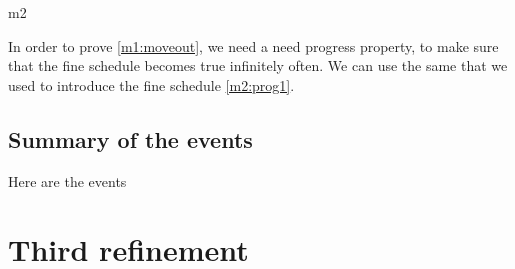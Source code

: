 \documentclass[12pt]{amsart}
\begin{document}
\begin{machine}{m2}


In order to prove \ref{m1:moveout}, we need a need progress property, to make sure that the fine schedule becomes true infinitely often. We can use the same that we used to introduce the fine schedule \eqref{m2:prog1}.

\subsection{Summary of the events} 

\begin{block}

\item[{}] Here are the events
\item[{}]

\item[{}]

\item[{}]

\item[{}]

\end{block}

\end{machine}

\section{Third refinement}
\end{document}
